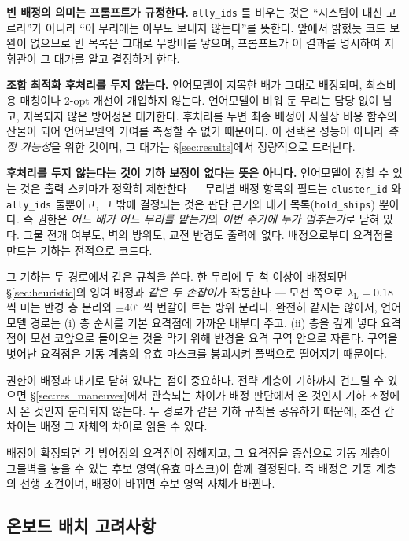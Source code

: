 \textbf{빈 배정의 의미는 프롬프트가 규정한다.} \texttt{ally\_ids} 를 비우는 것은 ``시스템이
대신 고르라''가 아니라 ``이 무리에는 아무도 보내지 않는다''를 뜻한다. 앞에서 밝혔듯 코드
보완이 없으므로 빈 목록은 그대로 무방비를 낳으며, 프롬프트가 이 결과를 명시하여
지휘관이 그 대가를 알고 결정하게 한다.

\textbf{조합 최적화 후처리를 두지 않는다.} 언어모델이 지목한 배가 그대로 배정되며, 최소비용
매칭이나 2-opt 개선이 개입하지 않는다. 언어모델이 비워 둔 무리는 담당 없이 남고, 지목되지
않은 방어정은 대기한다. 후처리를 두면 최종 배정이 사실상 비용 함수의 산물이 되어 언어모델의 기여를 측정할 수 없기 때문이다. 이 선택은 성능이 아니라
\emph{측정 가능성}을 위한 것이며, 그 대가는 \S\ref{sec:results}에서 정량적으로 드러난다.

\textbf{후처리를 두지 않는다는 것이 기하 보정이 없다는 뜻은 아니다.} 언어모델이 정할 수
있는 것은 출력 스키마가 정확히 제한한다 --- 무리별 배정 항목의 필드는 \texttt{cluster\_id} 와
\texttt{ally\_ids} 둘뿐이고, 그 밖에 결정되는 것은 판단 근거와 대기 목록(\texttt{hold\_ships})
뿐이다. 즉 권한은 \emph{어느 배가 어느 무리를 맡는가}와 \emph{이번 주기에 누가 멈추는가}로
닫혀 있다. 그물 전개 여부도, 벽의 방위도, 교전 반경도 출력에 없다. 배정으로부터 요격점을
만드는 기하는 전적으로 코드다.

그 기하는 두 경로에서 같은 규칙을 쓴다. 한 무리에 두 척 이상이 배정되면
\S\ref{sec:heuristic}의 잉여 배정과 \emph{같은 두 손잡이}가 작동한다 --- 모선 쪽으로
$\lambda_{\mathrm{L}} = 0.18$ 씩 미는 반경 층 분리와 $\pm 40^\circ$ 씩 번갈아 트는 방위 분리다. 완전히
같지는 않아서, 언어모델 경로는 (i) 층 순서를 기본 요격점에 가까운 배부터 주고, (ii) 층을
깊게 넣다 요격점이 모선 코앞으로 들어오는 것을 막기 위해 반경을 요격 구역 안으로 자른다.
구역을 벗어난 요격점은 기동 계층의 유효 마스크를 붕괴시켜 폴백으로 떨어지기 때문이다.

권한이 배정과 대기로 닫혀 있다는 점이 중요하다. 전략 계층이 기하까지 건드릴 수 있으면
\S\ref{sec:res_maneuver}에서 관측되는 차이가 배정 판단에서 온 것인지 기하 조정에서 온 것인지
분리되지 않는다. 두 경로가 같은 기하 규칙을 공유하기 때문에, 조건 간 차이는 배정 그 자체의
차이로 읽을 수 있다.

배정이 확정되면 각 방어정의 요격점이 정해지고, 그 요격점을 중심으로 기동 계층이 그물벽을 놓을
수 있는 후보 영역(유효 마스크)이 함께 결정된다. 즉 배정은 기동 계층의 선행 조건이며,
배정이 바뀌면 후보 영역 자체가 바뀐다.
\subsection{온보드 배치 고려사항}
\label{sec:deploy}

